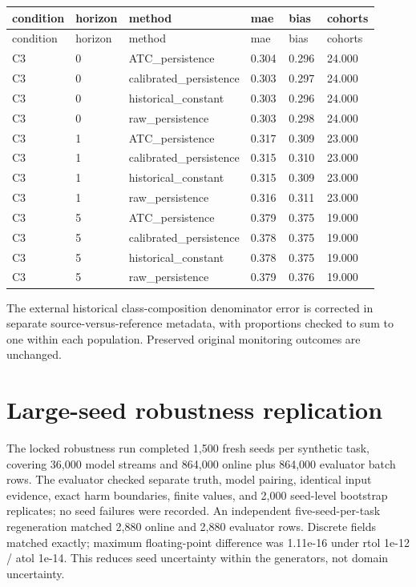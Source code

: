 \documentclass[11pt,a4paper]{article}
\begin{document}
\begingroup\scriptsize
\begin{longtable}{p{0.15166666666666667\linewidth}p{0.15166666666666667\linewidth}p{0.15166666666666667\linewidth}p{0.15166666666666667\linewidth}p{0.15166666666666667\linewidth}p{0.15166666666666667\linewidth}}
\toprule
condition & horizon & method & mae & bias & cohorts \\
\midrule
\endfirsthead
\toprule
condition & horizon & method & mae & bias & cohorts \\
\midrule
\endhead
C3 & 0 & ATC\_\allowbreak{}persistence & 0.304 & 0.296 & 24.000 \\
C3 & 0 & calibrated\_\allowbreak{}persistence & 0.303 & 0.297 & 24.000 \\
C3 & 0 & historical\_\allowbreak{}constant & 0.303 & 0.296 & 24.000 \\
C3 & 0 & raw\_\allowbreak{}persistence & 0.303 & 0.298 & 24.000 \\
C3 & 1 & ATC\_\allowbreak{}persistence & 0.317 & 0.309 & 23.000 \\
C3 & 1 & calibrated\_\allowbreak{}persistence & 0.315 & 0.310 & 23.000 \\
C3 & 1 & historical\_\allowbreak{}constant & 0.315 & 0.309 & 23.000 \\
C3 & 1 & raw\_\allowbreak{}persistence & 0.316 & 0.311 & 23.000 \\
C3 & 5 & ATC\_\allowbreak{}persistence & 0.379 & 0.375 & 19.000 \\
C3 & 5 & calibrated\_\allowbreak{}persistence & 0.378 & 0.375 & 19.000 \\
C3 & 5 & historical\_\allowbreak{}constant & 0.378 & 0.375 & 19.000 \\
C3 & 5 & raw\_\allowbreak{}persistence & 0.379 & 0.376 & 19.000 \\
\bottomrule
\end{longtable}
\endgroup

The external historical class-composition denominator error is corrected in separate source-versus-reference metadata, with proportions checked to sum to one within each population. Preserved original monitoring outcomes are unchanged.\par


\section{Large-seed robustness replication}

The locked robustness run completed 1,500 fresh seeds per synthetic task, covering 36,000 model streams and 864,000 online plus 864,000 evaluator batch rows. The evaluator checked separate truth, model pairing, identical input evidence, exact harm boundaries, finite values, and 2,000 seed-level bootstrap replicates; no seed failures were recorded. An independent five-seed-per-task regeneration matched 2,880 online and 2,880 evaluator rows. Discrete fields matched exactly; maximum floating-point difference was 1.11e-16 under rtol 1e-12 / atol 1e-14. This reduces seed uncertainty within the generators, not domain uncertainty.\par
\end{document}
